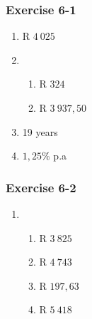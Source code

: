 {\begin{multicols}{3}
\subsubsection*{Exercise 6-1} %

    \begin{enumerate}[noitemsep, label=\textbf{\arabic*}.]
	\item R $4~ 025$%

	\item %
	\begin{enumerate}[noitemsep, label=\textbf{(\alph*)} ]
	    \item R $324$%

	    \item R $3~ 937,50$ %
	\end{enumerate}

	\item 19 years %

	\item $1,25\%$ p.a%
    \end{enumerate}


\subsubsection*{Exercise 6-2} %

    \begin{enumerate}[label=\textbf{\arabic*}.]
	\item %
	\begin{enumerate}[noitemsep, label=\textbf{(\alph*)} ]
	    \item R $3~ 825$%
	    \item R $4 ~743$%
	    \item R $197,63$%
	    \item R $5~ 418$%
	\end{enumerate}



\end{enumerate}
\end{multicols}}
